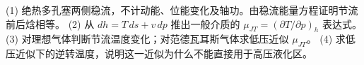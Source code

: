 (1) 绝热多孔塞两侧稳流，不计动能、位能变化及轴功。由稳流能量方程证明节流前后焓相等。
(2) 从 \(dh=T\,ds+v\,dp\) 推出一般介质的 \(\mu_{JT}=(\partial T/\partial p)_h\) 表达式。
(3) 对理想气体判断节流温度变化；对范德瓦耳斯气体求低压近似 \(\mu_{JT}\)。
(4) 求低压近似下的逆转温度，说明这一近似为什么不能直接用于高压液化区。
